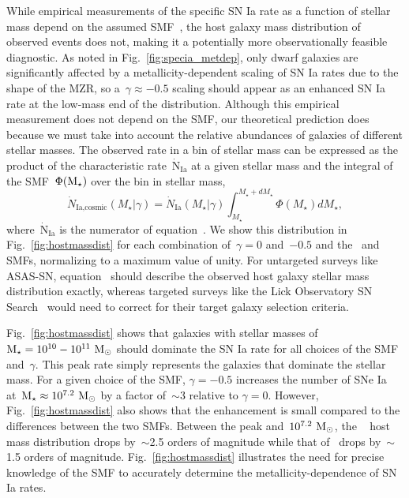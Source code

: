 \documentclass[ms.tex]{subfiles}
\begin{document}
While empirical measurements of the specific SN Ia rate as a function of
stellar mass depend on the assumed SMF~\citep{Gandhi2022}, the host galaxy
mass distribution of observed events does not, making it a potentially more
observationally feasible diagnostic.
As noted in Fig.~\ref{fig:specia_metdep}, only dwarf galaxies are
significantly affected by a metallicity-dependent scaling of SN Ia rates due to
the shape of the MZR, so a~$\gamma \approx -0.5$ scaling should appear as an
enhanced SN Ia rate at the low-mass end of the distribution.
Although this empirical measurement does not depend on the SMF, our theoretical
prediction does because we must take into account the relative abundances of
galaxies of different stellar masses.
The observed rate in a bin of stellar mass can be expressed as the product
of the characteristic rate~$\dot{\text{N}}_\text{Ia}$ at a given stellar mass
and the integral of the SMF~$\Phi(\text{M}_\star)$ over the bin in stellar mass,
\begin{equation}
\dot{N}_\text{Ia,cosmic}(M_\star | \gamma) = \dot{N}_\text{Ia}(M_\star | \gamma)
\int_{M_\star}^{M_\star + dM_\star} \Phi(M_\star) dM_\star,
\label{eq:hostmassdist}
\end{equation}
where~$\dot{\text{N}}_\text{Ia}$ is the numerator of equation~.
We show this distribution in Fig.~\ref{fig:hostmassdist} for each combination
of~$\gamma = 0$ and~$-0.5$ and the~\citet{Bell2003} and~\citet{Baldry2012} SMFs,
normalizing to a maximum value of unity.
For untargeted surveys like ASAS-SN, equation~ should
describe the observed host galaxy stellar mass distribution exactly, whereas
targeted surveys like the Lick Observatory SN Search~\citep[LOSS;][]{Li2000,
Filippenko2001} would need to correct for their target galaxy selection
criteria.
\par
Fig.~\ref{fig:hostmassdist} shows that galaxies with stellar masses of
$\text{M}_\star = 10^{10} - 10^{11}~\text{M}_\odot$ should dominate the SN Ia rate for all
choices of the SMF and~$\gamma$.
This peak rate simply represents the galaxies that dominate the stellar mass.
For a given choice of the SMF, $\gamma = -0.5$ increases the number of SNe Ia
at~$\text{M}_\star \approx 10^{7.2}~\text{M}_\odot$ by a factor of~$\sim$3 relative to
$\gamma = 0$.
However, Fig.~\ref{fig:hostmassdist} also shows that the enhancement is small
compared to the differences between the two SMFs.
Between the peak and~$10^{7.2}~\text{M}_\odot$, the ~\citet{Bell2003} host mass
distribution drops by~$\sim$2.5 orders of magnitude while
that of~\citet{Baldry2012} drops by~$\sim$1.5 orders of magnitude.
Fig.~\ref{fig:hostmassdist} illustrates the need for precise knowledge of the
SMF to accurately determine the metallicity-dependence of SN Ia rates.
\end{document}
